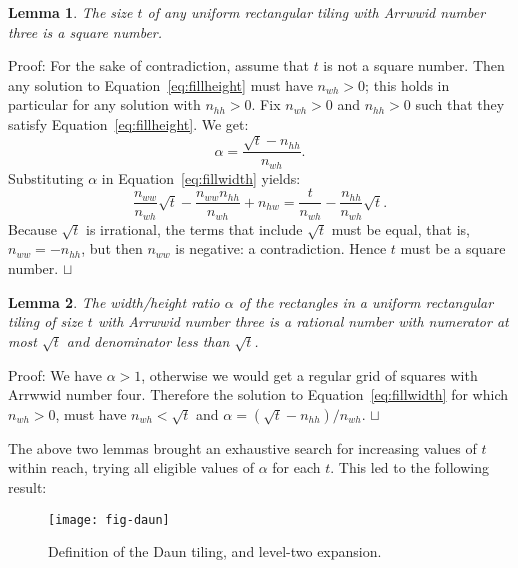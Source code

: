 \documentclass[11pt,a4paper]{article}
\newtheorem{lemma}{Lemma}
\newenvironment{proof}{Proof:}{\qed}
\def\squareforqed{\hbox{\rlap{$\sqcap$}$\sqcup$}}
\def\qed{\ifmmode\squareforqed\else{\unskip\nobreak\hfil
\penalty50\hskip1em\null\nobreak\hfil\squareforqed
\parfillskip=0pt\finalhyphendemerits=0\endgraf}\fi}
\begin{document}
\begin{lemma}
The size $t$ of any uniform rectangular tiling with Arrwwid number three is a square number.
\end{lemma}
\begin{proof}
For the sake of contradiction, assume that $t$ is not a square number. Then any solution to Equation~\ref{eq:fillheight} must have $n_{wh} > 0$; this holds in particular for any solution with $n_{hh} > 0$. Fix $n_{wh} > 0$ and $n_{hh} > 0$ such that they satisfy Equation~\ref{eq:fillheight}. We get:\begin{equation}\label{eq:alpha}
\alpha = \frac{\sqrt{t} - n_{hh}}{n_{wh}}.
\end{equation}
Substituting $\alpha$ in Equation~\ref{eq:fillwidth} yields:\begin{equation}
\frac{n_{ww}}{n_{wh}}\sqrt{t} - \frac{n_{ww}n_{hh}}{n_{wh}} + n_{hw} =
\frac{t}{n_{wh}} - \frac{n_{hh}}{n_{wh}}\sqrt{t}.
\end{equation}
Because $\sqrt{t}$ is irrational, the terms that include $\sqrt{t}$ must be equal, that is, $n_{ww} = -n_{hh}$, but then $n_{ww}$ is negative: a contradiction. Hence $t$ must be a square number.
\end{proof}

\begin{lemma}
The width/height ratio $\alpha$ of the rectangles in a uniform rectangular tiling of size $t$ with Arrwwid number three is a rational number with numerator at most $\sqrt{t}$ and denominator less than $\sqrt{t}$.
\end{lemma}
\begin{proof}
We have $\alpha > 1$, otherwise we would get a regular grid of squares with Arrwwid number four. Therefore the solution to Equation~\ref{eq:fillwidth} for which $n_{wh} > 0$, must have $n_{wh} < \sqrt{t}$ and $\alpha = (\sqrt{t} - n_{hh})/n_{wh}$. \end{proof}

The above two lemmas brought an exhaustive search for increasing values of $t$ within reach, trying all eligible values of $\alpha$ for each $t$. This led to the following result:

\begin{figure}
\centering
\texttt{[image: fig-daun]}
\caption{Definition of the Daun tiling, and level-two expansion.}
\label{fig:daun}
\end{figure}
\end{document}
